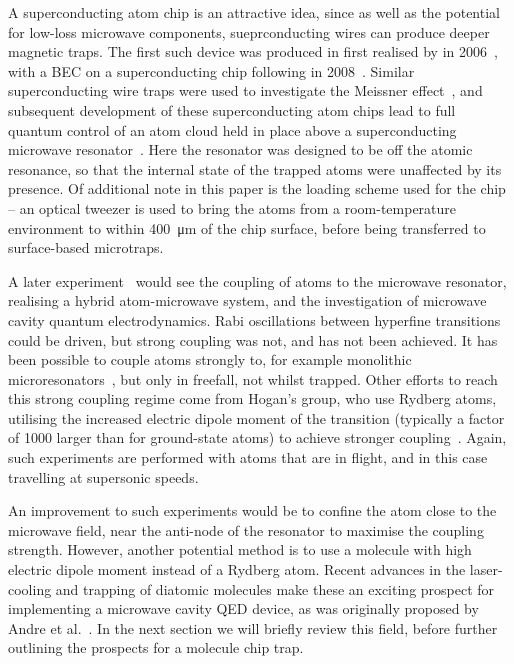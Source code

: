 A superconducting atom chip is an attractive idea, since as well as the
potential for low-loss microwave components, sueprconducting wires can produce
deeper magnetic traps. The first such device was produced in first realised by
 in 2006~\cite{Nirrengarten2006}, with a BEC on a
superconducting chip following in 2008~\cite{Roux2008}. Similar superconducting
wire traps were used to investigate the Meissner
effect~\cite{PhysRevLett.101.183006}, and subsequent development of these
superconducting atom chips lead to full quantum control of an atom cloud held
in place above a superconducting microwave resonator~\cite{Bernon2013}. Here
the resonator was designed to be off the atomic resonance, so that the internal
state of the trapped atoms were unaffected by its presence. Of additional note
in this paper is the loading scheme used for the chip -- an optical tweezer is
used to bring the atoms from a room-temperature environment to within
\SI{400}{\micro\meter} of the chip surface, before being transferred to
surface-based microtraps.

A later experiment~\cite{Hatterman2017} would see the coupling of atoms to the
microwave resonator, realising a hybrid atom-microwave system, and the
investigation of microwave cavity quantum electrodynamics. Rabi oscillations
between hyperfine transitions could be driven, but strong coupling was not, and
has not been achieved. It has been possible to couple atoms strongly to, for
example monolithic microresonators~\cite{Aoki2006}, but only in freefall, not whilst
trapped. Other efforts to reach this strong coupling regime come from Hogan's
group, who use Rydberg atoms, utilising the increased electric dipole moment of
the transition (typically a factor of 1000 larger than for ground-state atoms)
to achieve stronger coupling~\cite{PhysRevLett.124.193604}. Again, such
experiments are performed with atoms that are in flight, and in this case
travelling at supersonic speeds.

An improvement to such experiments would be to confine the atom close to the
microwave field, near the anti-node of the resonator to maximise the coupling
strength. However, another potential method is to use a molecule with high
electric dipole moment instead of a Rydberg atom. Recent advances in the
laser-cooling and trapping of diatomic molecules make these an exciting
prospect for implementing a microwave cavity QED device, as was originally
proposed by Andre et al.~\cite{Andre2006}. In the next section we will briefly
review this field, before further outlining the prospects for a molecule chip
trap.

